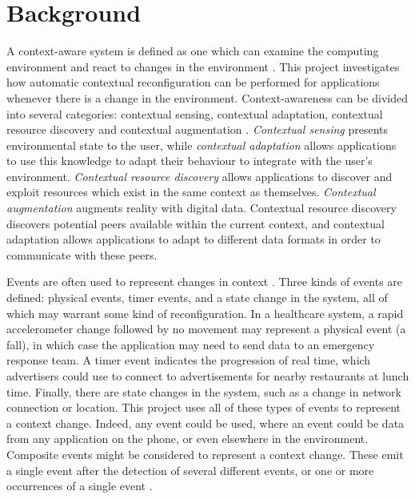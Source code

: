 \documentclass[12pt,twoside,notitlepage]{report}
\begin{document}
\section{Background}

A context-aware system is defined as one which can examine the computing environment and react to changes in the environment \cite{schilit1994context}. 
This project investigates how automatic contextual reconfiguration can be performed for applications whenever there is a change in the environment. 
Context-awareness can be divided into several categories: contextual sensing, contextual adaptation, contextual resource discovery and contextual augmentation \cite{pascoe1998adding}.
{\sl Contextual sensing} presents environmental state to the user, while {\sl contextual adaptation} allows applications to use this knowledge to adapt their behaviour to integrate with the user's environment.
{\sl Contextual resource discovery} allows applications to discover and exploit resources which exist in the same context as themselves. 
{\sl Contextual augmentation} augments reality with digital data. 
Contextual resource discovery discovers potential peers available within the current context, and contextual adaptation allows applications to adapt to different data formats in order to communicate with these peers. 


Events are often used to represent changes in context \cite{muhl2006distributed,harter2002anatomy,baldauf2007survey,dey2001conceptual}.
Three kinds of events are defined: physical events, timer events, and a state change in the system, all of which may warrant some kind of reconfiguration. 
In a healthcare system, a rapid accelerometer change followed by no movement may represent a physical event (a fall), in which case the application may need to send data to an emergency response team.
A timer event indicates the progression of real time, which advertisers could use to connect to advertisements for nearby restaurants at lunch time. 
Finally, there are state changes in the system, such as a change in network connection or location. 
This project uses all of these types of events to represent a context change. 
Indeed, any event could be used, where an event could be data from any application on the phone, or even elsewhere in the environment. 
Composite events might be considered to represent a context change. 
These emit a single event after the detection of several different events, or one or more occurrences of a single event \cite{chakravarthy1994composite}. 
\end{document}
